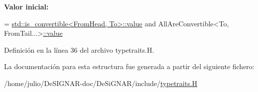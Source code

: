 {\bfseries Valor inicial\+:}
\begin{DoxyCode}
=
      \hyperlink{namespace_designar_a7dd2a7b6d96f664ce612b506c8eb2fb8}{std::is\_convertible<FromHead, To>::value} and
      AllAreConvertible<To, FromTail...>\hyperlink{struct_designar_1_1_all_are_convertible_a698b71c73875452298bc2e96935240c3}{::value}
\end{DoxyCode}


Definición en la línea 36 del archivo typetraits.\+H.



La documentación para esta estructura fue generada a partir del siguiente fichero\+:\begin{DoxyCompactItemize}
\item 
/home/julio/\+De\+S\+I\+G\+N\+A\+R-\/doc/\+De\+Si\+G\+N\+A\+R/include/\hyperlink{typetraits_8_h}{typetraits.\+H}\end{DoxyCompactItemize}
